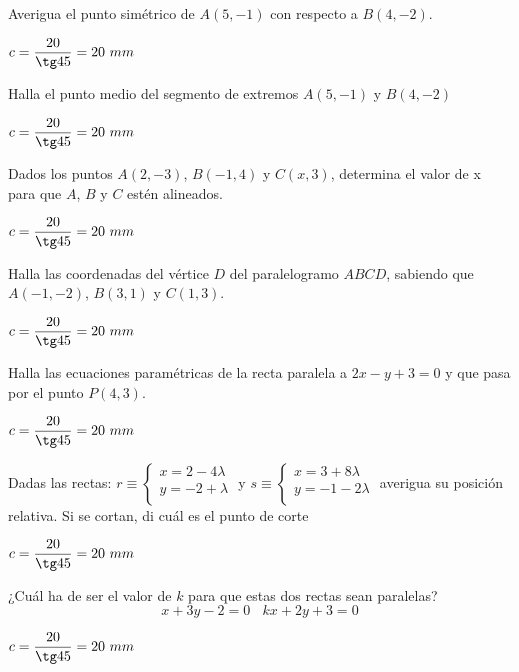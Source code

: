 \documentclass[spanish, 11pt]{exam}
\begin{document}
\begin{questions}
\question Averigua el punto simétrico de $A(5, -1)$ con respecto a $B(4, -2)$. 
\begin{solution} $c=\dfrac{20}{\tg45} = 20 \ mm $\end{solution}

\question Halla el punto medio del segmento de extremos $A(5, -1)$ y $B(4, -2)$ 
\begin{solution} $c=\dfrac{20}{\tg45} = 20 \ mm $\end{solution}

\question Dados los puntos $A(2, -3)$, $B(-1, 4)$ y $C(x, 3)$, determina el valor de x para que $A$, $B$ y $C$ estén alineados. 
\begin{solution} $c=\dfrac{20}{\tg45} = 20 \ mm $\end{solution}

\question Halla las coordenadas del vértice $D$ del paralelogramo $ABCD$, sabiendo que $A(-1, -2)$, $B(3, 1)$ y $C(1, 3)$.
\begin{solution} $c=\dfrac{20}{\tg45} = 20 \ mm $\end{solution}


\question Halla las ecuaciones paramétricas de la recta paralela a $2x - y + 3 = 0 $ y que pasa por el punto $P(4, 3)$.
\begin{solution} $c=\dfrac{20}{\tg45} = 20 \ mm $\end{solution}


\question Dadas las rectas:  $r \equiv \left\{ 
    {\begin{matrix}
	   {x = 2 - 4\lambda }  \\ 
	   {y =  - 2 + \lambda}  \\ 
    \end{matrix} } \right.$ 	y 	
    $s \equiv \left\{ {\begin{matrix}
   {x = 3 + 8\lambda }  \\ 
   {y =  - 1 - 2\lambda }  \\ 
\end{matrix} } \right.$  averigua su posición relativa. Si se cortan, di cuál es el punto de corte

\begin{solution} $c=\dfrac{20}{\tg45} = 20 \ mm $\end{solution}

\question ¿Cuál ha de ser el valor de $k$ para que estas dos rectas sean paralelas? $$x + 3y -2 = 0 \ \ \ \  kx + 2y + 3 = 0$$ 
\begin{solution} $c=\dfrac{20}{\tg45} = 20 \ mm $\end{solution}


\end{questions}
\end{document}
